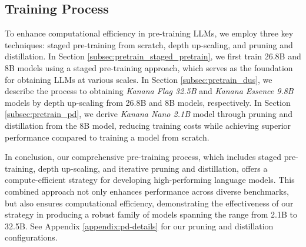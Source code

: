 \subsection{Training Process}
\label{subsec:pretrain_train_process}


To enhance computational efficiency in pre-training LLMs, we employ three key techniques: staged pre-training from scratch, depth up-scaling, and pruning and distillation.
In Section \ref{subsec:pretrain_staged_pretrain}, we first train 26.8B and 8B models using a staged pre-training approach, which serves as the foundation for obtaining LLMs at various scales.
In Section \ref{subsec:pretrain_dus}, we describe the process to obtaining \textit{Kanana Flag 32.5B} and \textit{Kanana Essence 9.8B} models by depth up-scaling from 26.8B and 8B models, respectively.
In Section \ref{subsec:pretrain_pd}, we derive \textit{Kanana Nano 2.1B} model through pruning and distillation from the 8B model, reducing training costs while achieving superior performance compared to training a model from scratch.








In conclusion, our comprehensive pre-training process, which includes staged pre-training, depth up-scaling, and iterative pruning and distillation, offers a compute-efficient strategy for developing high-performing language models. 
This combined approach not only enhances performance across diverse benchmarks, but also ensures computational efficiency, demonstrating the effectiveness of our strategy in producing a robust family of models spanning the range from 2.1B to 32.5B. See Appendix \ref{appendix:pd-details} for our pruning and distillation configurations.